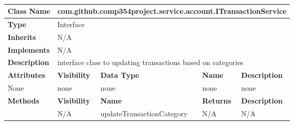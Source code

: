 \documentclass[12pt]{article}
\begin{document}
\begin{table}[H]
\centering
\caption{}
\label{my-label}
\begin{tabular}{|l|l|l|l|l|}
\hline
\textbf{Class Name}               & \multicolumn{4}{l|}{com.github.comp354project.service.account.ITransactionService}        \\ \hline
\textbf{Type}                     & \multicolumn{4}{l|}{Interface}                                                            \\ \hline
\textbf{Inherits}                 & \multicolumn{4}{l|}{N/A}                                                                  \\ \hline
\textbf{Implements}               & \multicolumn{4}{l|}{N/A}                                                                  \\ \hline
\textbf{Description}              & \multicolumn{4}{l|}{interface class to updating transactions based on categories}         \\ \hline
\textbf{Attributes}               & \textbf{Visibility} & \textbf{Data Type}        & \textbf{Name}    & \textbf{Description} \\ \hline
None                              & none                & none                      & none             & none                 \\ \hline
\multirow{2}{*}{\textbf{Methods}} & \textbf{Visibility} & \textbf{Name}             & \textbf{Returns} & \textbf{Description} \\ \cline{2-5} 
                                  & N/A                 & updateTransactionCategory & N/A              & N/A                  \\ \hline
\end{tabular}
\end{table}
\end{document}

